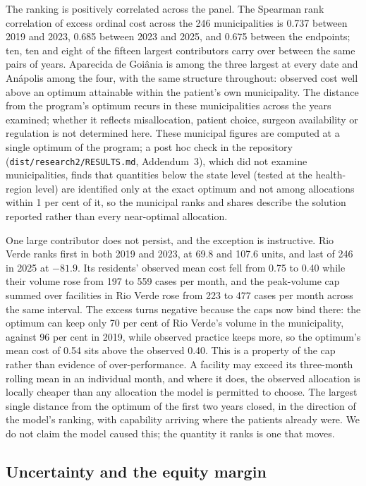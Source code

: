 The ranking is positively correlated across the panel. The Spearman rank correlation of excess ordinal cost across the 246 municipalities is 0.737 between 2019 and 2023, 0.685
between 2023 and 2025, and 0.675 between the endpoints; ten, ten and eight of
the fifteen largest contributors carry over between the same pairs of years.
Aparecida de Goi\^ania is among the three largest at every date and An\'apolis
among the four, with the same structure throughout: observed cost well above an
optimum attainable within the patient's own municipality. The distance from the program's optimum recurs in these municipalities across the years examined; whether it reflects misallocation, patient choice, surgeon availability or regulation is not determined here. These municipal figures are computed at a single optimum of the program; a post hoc check in the repository (\texttt{dist/research2/RESULTS.md}, Addendum~3), which did not examine municipalities, finds that quantities below the state level (tested at the health-region level) are identified only at the exact optimum and not among allocations within 1 per cent of it, so the municipal ranks and shares describe the solution reported rather than every near-optimal allocation.

One large contributor does not persist, and the exception is instructive. Rio
Verde ranks first in both 2019 and 2023, at 69.8 and 107.6 units, and last of 246
in 2025 at $-81.9$. Its residents' observed mean cost fell from 0.75 to 0.40 while
their volume rose from 197 to 559 cases per month, and the peak-volume cap summed
over facilities in Rio Verde rose from 223 to 477 cases per month across the same
interval. The excess turns negative because the caps now bind there: the optimum can keep
only 70 per cent of Rio Verde's volume in the municipality, against 96 per cent
in 2019, while observed practice keeps more, so the optimum's mean cost of 0.54
sits above the observed 0.40. This is a property of the
cap rather than evidence of over-performance. A facility may exceed its
three-month rolling mean in an individual month, and where it does, the observed
allocation is locally cheaper than any allocation the model is permitted to
choose. The largest single
distance from the optimum of the first two years closed, in the direction of the
model's ranking, with capability arriving where the patients already were. We do
not claim the model caused this; the quantity it ranks is one that
moves.

\subsection{Uncertainty and the equity margin}
\label{sec:uncertainty}

